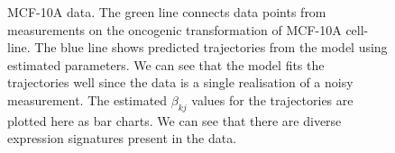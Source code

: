 \begin{figure}
  \centering
  \caption{MCF-10A data.  The green line connects data points from measurements on the oncogenic transformation of MCF-10A cell-line. The blue line shows predicted trajectories from the model using estimated parameters. We can see that the model fits the trajectories well since the data is a single realisation of a noisy measurement.  The estimated $\beta_{kj}$ values for the trajectories are plotted here as bar charts. We can see that there are diverse expression signatures present in the data.}
  \label{fig:data-fit-traj}
\end{figure}

